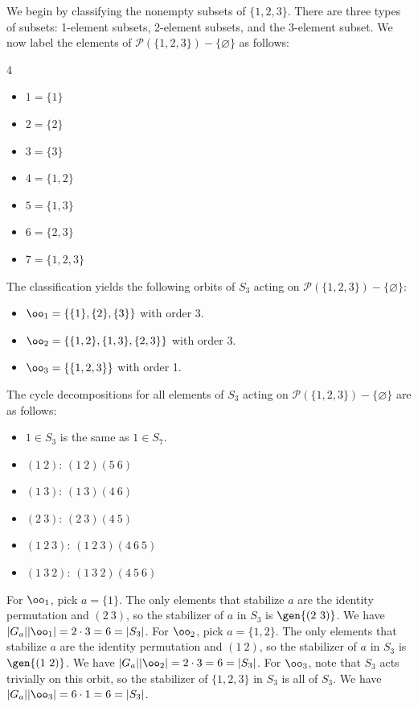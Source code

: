 \begin{solalph}
	\item We begin by classifying the nonempty subsets of $\{1, 2, 3\}$. There are three types of subsets: 1-element subsets, 2-element subsets, and the 3-element subset. We now label the elements of $\mathcal{P}(\{1, 2, 3\}) - \{\varnothing\}$ as follows:
	\begin{multicols}{4}
		\begin{itemize}
			\item $1 = \{1\}$
			\item $2 = \{2\}$
			\item $3 = \{3\}$
			\item $4 = \{1, 2\}$
			\item $5 = \{1, 3\}$
			\item $6 = \{2, 3\}$
			\item $7 = \{1, 2, 3\}$
		\end{itemize}
	\end{multicols}
	The classification yields the following orbits of $S_3$ acting on $\mathcal{P}(\{1, 2, 3\}) - \{\varnothing\}$:
	\begin{itemize}
		\item $\oo_1 = \{\{1\}, \{2\}, \{3\}\}$ with order 3.
		\item $\oo_2 = \{\{1, 2\}, \{1, 3\}, \{2, 3\}\}$ with order 3.
		\item $\oo_3 = \{\{1, 2, 3\}\}$ with order 1.
	\end{itemize}
	The cycle decompositions for all elements of $S_3$ acting on $\mathcal{P}(\{1, 2, 3\}) - \{\varnothing\}$ are as follows:
	\begin{itemize}
		\item $1 \in S_3$ is the same as $1 \in S_7$.
		\item $(1\ 2)$: $(1\ 2)(5\ 6)$
		\item $(1\ 3)$: $(1\ 3)(4\ 6)$
		\item $(2\ 3)$: $(2\ 3)(4\ 5)$
		\item $(1\ 2\ 3)$: $(1\ 2\ 3)(4\ 6\ 5)$
		\item $(1\ 3\ 2)$: $(1\ 3\ 2)(4\ 5\ 6)$
	\end{itemize}
	For $\oo_1$, pick $a = \{1\}$. The only elements that stabilize $a$ are the identity permutation and $(2\ 3)$, so the stabilizer of $a$ in $S_3$ is $\gen{(2\ 3)}$. We have $|G_a||\oo_1| = 2 \cdot 3 = 6 = |S_3|$. For $\oo_2$, pick $a = \{1, 2\}$. The only elements that stabilize $a$ are the identity permutation and $(1\ 2)$, so the stabilizer of $a$ in $S_3$ is $\gen{(1\ 2)}$. We have $|G_a||\oo_2| = 2 \cdot 3 = 6 = |S_3|$. For $\oo_3$, note that $S_3$ acts trivially on this orbit, so the stabilizer of $\{1, 2, 3\}$ in $S_3$ is all of $S_3$. We have $|G_a||\oo_3| = 6 \cdot 1 = 6 = |S_3|$.
\end{solalph}


